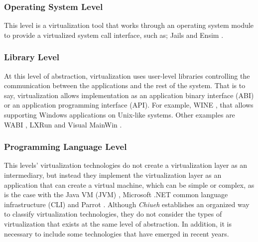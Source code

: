 	\subsubsection{Operating System Level}
	This level is a virtualization tool that works through an operating system module to provide a virtualized system call interface,  such as; Jails \cite{Biederman2006} and Ensim \cite{Ensim}.
	
	\subsubsection{Library Level}
	At this level of abstraction, virtualization uses user-level libraries controlling the communication between the applications and the rest of the system. 
	That is to say, virtualization allows implementation as  an application binary interface (ABI) or an application programming interface (API). 
	For example, WINE \cite{Wine}, that allows supporting Windows applications on Unix-like systems. 
	Other examples are WABI \cite{WABI}, LXRun \cite{LXRUN} and Visual MainWin \cite{Fisher2006}.

	\subsubsection{Programming Language Level}
	This levels' virtualization technologies do not create a virtualization layer as an intermediary, but instead they implement the virtualization layer as an application that can create a virtual machine, which can be simple or complex, as is the case with the Java VM  (JVM) \cite{Lindholm1997}, Microsoft .NET common language infrastructure (CLI) \cite{Thai2003} and Parrot \cite {Parrot}. Although \textit{Chiueh} \cite{Chiueh2005} establishes an organized way to classify virtualization technologies, they do not consider the types of virtualization that exists at the same level of abstraction. In addition, it is necessary to include some technologies that have emerged in recent years.